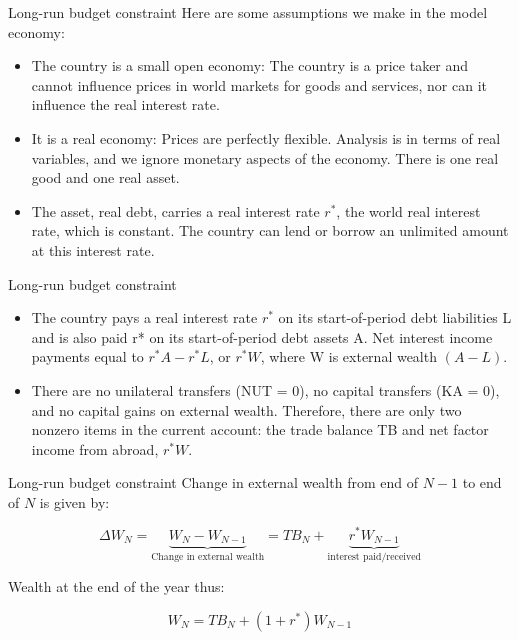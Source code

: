 \documentclass[
  ignorenonframetext,
]{beamer}
\begin{document}
\begin{frame}{Long-run budget constraint}
\label{long-run-budget-constraint}
Here are some assumptions we make in the model economy:

\begin{itemize}
\item
  The country is a small open economy: The country is a price taker and
  cannot influence prices in world markets for goods and services, nor
  can it influence the real interest rate.
\item
  It is a real economy: Prices are perfectly flexible. Analysis is in
  terms of real variables, and we ignore monetary aspects of the
  economy. There is one real good and one real asset.
\item
  The asset, real debt, carries a real interest rate \(r^*\), the world
  real interest rate, which is constant. The country can lend or borrow
  an unlimited amount at this interest rate.
\end{itemize}
\end{frame}

\begin{frame}{Long-run budget constraint}
\label{long-run-budget-constraint-1}
\begin{itemize}
\item
  The country pays a real interest rate \(r^*\) on its start-of-period
  debt liabilities L and is also paid r* on its start-of-period debt
  assets A. Net interest income payments equal to \(r^*A − r^*L\), or
  \(r^*W\), where W is external wealth \((A − L)\).
\item
  There are no unilateral transfers (NUT = 0), no capital transfers (KA
  = 0), and no capital gains on external wealth. Therefore, there are
  only two nonzero items in the current account: the trade balance TB
  and net factor income from abroad, \(r^*W\).
\end{itemize}
\end{frame}

\begin{frame}{Long-run budget constraint}
\label{long-run-budget-constraint-2}
Change in external wealth from end of \(N-1\) to end of \(N\) is given
by:

\[
\Delta W_N=\underbrace{W_N-W_{N-1}}_{\text{Change in external wealth}}=TB_N+\underbrace{r^*W_{N-1}}_{\text{interest paid/received}}
\]

Wealth at the end of the year thus:

\[
W_N=TB_N+(1+r^*)W_{N-1}
\]
\end{frame}
\end{document}
